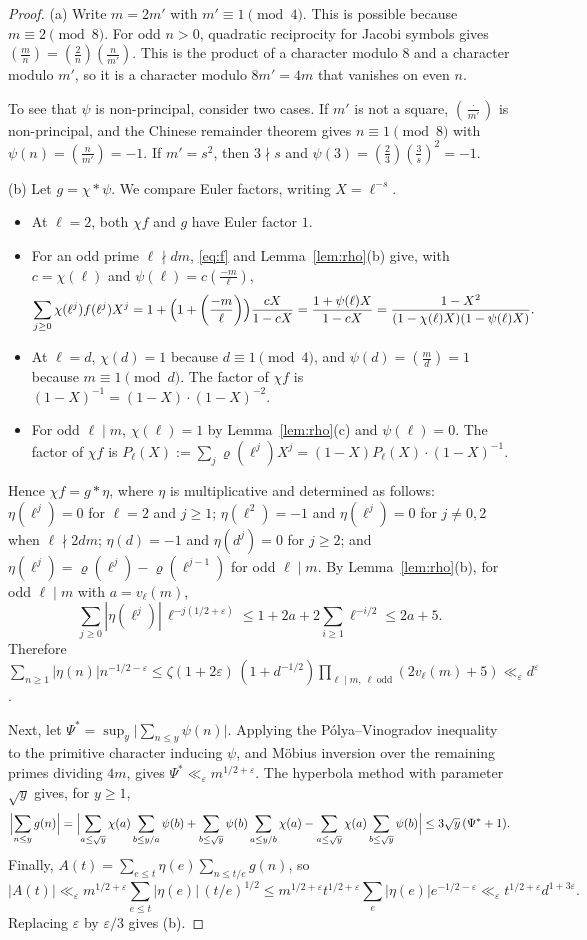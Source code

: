\documentclass[11pt]{amsart}
\theoremstyle{remark}
\theoremstyle{definition}
\numberwithin{equation}{section}
\newcommand{\eps}{\varepsilon}
\newcommand{\leg}[2]{\left(\frac{#1}{#2}\right)}
\begin{document}
\begin{proof}
(a) Write $m=2m'$ with $m'\equiv1\pmod 4$. This is possible because $m\equiv 2\pmod 8$. For odd $n>0$, quadratic reciprocity for Jacobi symbols gives $\leg{m}{n}=\leg{2}{n}\leg{n}{m'}$. This is the product of a character modulo $8$ and a character modulo $m'$, so it is a character modulo $8m'=4m$ that vanishes on even $n$.

To see that $\psi$ is non-principal, consider two cases. If $m'$ is not a square, $\leg{\cdot}{m'}$ is non-principal, and the Chinese remainder theorem gives $n\equiv1\pmod 8$ with $\psi(n)=\leg{n}{m'}=-1$. If $m'=s^2$, then $3\nmid s$ and $\psi(3)=\leg{2}{3}\leg{3}{s}^2=-1$.

(b) Let $g=\chi*\psi$. We compare Euler factors, writing $X=\ell^{-s}$.
\begin{itemize}
\item At $\ell=2$, both $\chi f$ and $g$ have Euler factor $1$.
\item For an odd prime $\ell\nmid dm$, \eqref{eq:f} and Lemma~\ref{lem:rho}(b) give, with $c=\chi(\ell)$ and $\psi(\ell)=c\leg{-m}{\ell}$,
\[
\sum_{j\ge0}\chi(\ell^j)f(\ell^j)X^j=1+\Bigl(1+\leg{-m}{\ell}\Bigr)\frac{cX}{1-cX}=\frac{1+\psi(\ell)X}{1-cX}=\frac{1-X^2}{(1-\chi(\ell)X)(1-\psi(\ell)X)} .
\]
\item At $\ell=d$, $\chi(d)=1$ because $d\equiv1\pmod 4$, and $\psi(d)=\leg{m}{d}=1$ because $m\equiv1\pmod d$. The factor of $\chi f$ is $(1-X)^{-1}=(1-X)\cdot(1-X)^{-2}$.
\item For odd $\ell\mid m$, $\chi(\ell)=1$ by Lemma~\ref{lem:rho}(c) and $\psi(\ell)=0$. The factor of $\chi f$ is $P_\ell(X):=\sum_j\varrho(\ell^j)X^j=(1-X)P_\ell(X)\cdot(1-X)^{-1}$.
\end{itemize}
Hence $\chi f=g*\eta$, where $\eta$ is multiplicative and determined as follows: $\eta(\ell^j)=0$ for $\ell=2$ and $j\ge1$; $\eta(\ell^2)=-1$ and $\eta(\ell^j)=0$ for $j\ne0,2$ when $\ell\nmid 2dm$; $\eta(d)=-1$ and $\eta(d^j)=0$ for $j\ge2$; and $\eta(\ell^j)=\varrho(\ell^j)-\varrho(\ell^{j-1})$ for odd $\ell\mid m$. By Lemma~\ref{lem:rho}(b), for odd $\ell\mid m$ with $a=v_\ell(m)$,
\[
\sum_{j\ge0}|\eta(\ell^j)|\,\ell^{-j(1/2+\eps)}\le 1+2a+2\sum_{i\ge1}\ell^{-i/2}\le 2a+5 .
\]
Therefore $\sum_{n\ge1}|\eta(n)|n^{-1/2-\eps}\le \zeta(1+2\eps)\,(1+d^{-1/2})\prod_{\ell\mid m,\ \ell\ \mathrm{odd}}(2v_\ell(m)+5)\ll_\eps d^{\eps}$.

Next, let $\Psi^*=\sup_{y}\bigl|\sum_{n\le y}\psi(n)\bigr|$. Applying the P\'olya--Vinogradov inequality \cite[Ch.~23]{Da} to the primitive character inducing $\psi$, and M\"obius inversion over the remaining primes dividing $4m$, gives $\Psi^*\ll_\eps m^{1/2+\eps}$. The hyperbola method with parameter $\sqrt y$ gives, for $y\ge1$,
\[
\Bigl|\sum_{n\le y}g(n)\Bigr|=\Bigl|\sum_{a\le\sqrt y}\chi(a)\sum_{b\le y/a}\psi(b)+\sum_{b\le\sqrt y}\psi(b)\sum_{a\le y/b}\chi(a)-\sum_{a\le\sqrt y}\chi(a)\sum_{b\le \sqrt y}\psi(b)\Bigr|\le 3\sqrt y\,(\Psi^*+1).
\]
Finally, $A(t)=\sum_{e\le t}\eta(e)\sum_{n\le t/e}g(n)$, so
\[
|A(t)|\ll_\eps m^{1/2+\eps}\sum_{e\le t}|\eta(e)|\,(t/e)^{1/2}\le m^{1/2+\eps}t^{1/2+\eps}\sum_{e}|\eta(e)|e^{-1/2-\eps}\ll_\eps t^{1/2+\eps}d^{1+3\eps}.
\]
Replacing $\eps$ by $\eps/3$ gives (b).


\end{proof}
\end{document}
